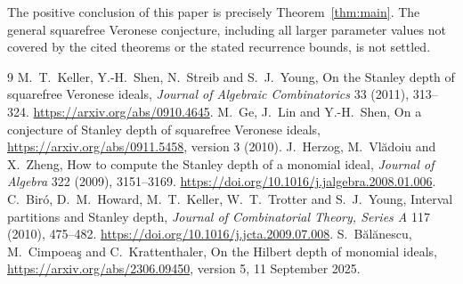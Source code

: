 \documentclass[11pt,a4paper]{article}
\begin{document}
The positive conclusion of this paper is precisely Theorem~\ref{thm:main}.
The general squarefree Veronese conjecture, including all larger parameter
values not covered by the cited theorems or the stated recurrence bounds,
is not settled.

\begin{thebibliography}{9}
 M.~T.~Keller, Y.-H.~Shen, N.~Streib and S.~J.~Young,
On the Stanley depth of squarefree Veronese ideals,
\emph{Journal of Algebraic Combinatorics} 33 (2011), 313--324.
\url{https://arxiv.org/abs/0910.4645}.
 M.~Ge, J.~Lin and Y.-H.~Shen,
On a conjecture of Stanley depth of squarefree Veronese ideals,
\url{https://arxiv.org/abs/0911.5458}, version 3 (2010).
 J.~Herzog, M.~Vl\u{a}doiu and X.~Zheng,
How to compute the Stanley depth of a monomial ideal,
\emph{Journal of Algebra} 322 (2009), 3151--3169.
\url{https://doi.org/10.1016/j.jalgebra.2008.01.006}.
 C.~Bir\'o, D.~M.~Howard, M.~T.~Keller,
W.~T.~Trotter and S.~J.~Young,
Interval partitions and Stanley depth,
\emph{Journal of Combinatorial Theory, Series A} 117 (2010), 475--482.
\url{https://doi.org/10.1016/j.jcta.2009.07.008}.
 S.~B\u{a}l\u{a}nescu, M.~Cimpoea\c{s} and C.~Krattenthaler,
On the Hilbert depth of monomial ideals,
\url{https://arxiv.org/abs/2306.09450}, version 5, 11 September 2025.
\end{thebibliography}

\clearpage\appendix
\end{document}
